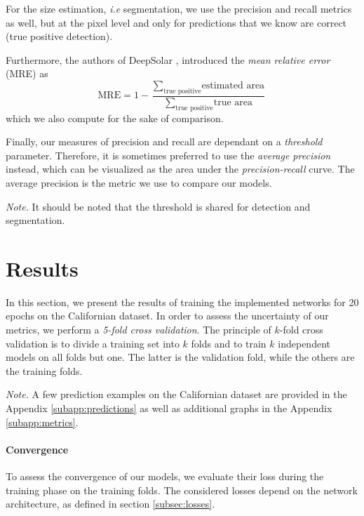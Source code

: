 \documentclass[twocolumn,superscriptaddress,aps,nofootinbib]{revtex4-1}
\begin{document}
For the size estimation, \emph{i.e} segmentation, we use the precision and recall metrics as well, but at the pixel level and only for predictions that we know are correct (true positive detection).

Furthermore, the authors of DeepSolar \cite{yu2018deepsolar}, introduced the \emph{mean relative error} (MRE) as
\begin{equation}
    \text{MRE} = 1 - \frac{\sum_{\text{true positive}} \text{estimated area}}{\sum_{\text{true positive}} \text{true area}}
\end{equation}
which we also compute for the sake of comparison.

Finally, our measures of precision and recall are dependant on a \emph{
threshold} parameter. Therefore, it is sometimes preferred to use the \emph{average precision} instead, which can be visualized as the area under the \emph{precision-recall} curve. The average precision is the metric we use to compare our models.

\emph{Note.} It should be noted that the threshold is shared for detection and segmentation.

\section{Results} \label{sec:results}

In this section, we present the results of training the implemented networks for 20 epochs on the Californian dataset. In order to assess the uncertainty of our metrics, we perform a \emph{5-fold cross validation}. The principle of $k$-fold cross validation is to divide a training set into $k$ folds and to train $k$ independent models on all folds but one. The latter is the validation fold, while the others are the training folds.

\emph{Note.} A few prediction examples on the Californian dataset are provided in the Appendix \ref{subapp:predictions} as well as additional graphs in the Appendix \ref{subapp:metrics}.

\vspace{1em}

\paragraph{Convergence}
To assess the convergence of our models, we evaluate their loss during the training phase on the training folds. The considered losses depend on the network architecture, as defined in section \ref{subsec:losses}.
\end{document}
